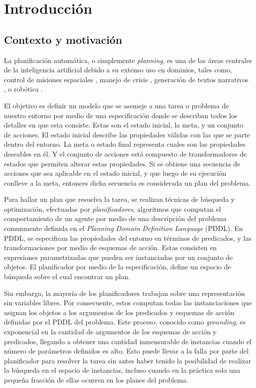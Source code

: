 \chapter{Introducción}
\label{ch:into}

\section{Contexto y motivación}
La planificación automática, o simplemente \emph{planning}, es una de las áreas
centrales de la inteligencia artificial debido a su extenso uso en dominios,
tales como, control de misiones espaciales \citep{RabideauG-et-al-2001}, manejo
de crisis \citep{Bienkowki-1995}, generación de textos narrativos
\citep{Goudoulakis-et-al-2016}, o robótica \citep{Munoz-et-al-2016}.

El objetivo es definir un modelo que se asemeje a una tarea o problema de
nuestro entorno por medio de una especificación donde se describan todos los
detalles en que esta consiste. Estas son el estado inicial, la meta, y un
conjunto de acciones. El estado inicial describe las propiedades válidas con las
que se parte dentro del entorno. La meta o estado final representa cuales son
las propiedades deseables en él. Y el conjunto de acciones está compuesto de
transformadores de estados que permiten alterar estas propiedades. Si se obtiene
una secuencia de acciones que sea aplicable en el estado inicial, y que luego de
su ejecución conlleve a la meta, entonces dicha secuencia es considerada un plan
del problema. \citep{Georgievski-et-al-2016}

Para hallar un plan que resuelva la tarea, se realizan técnicas de búsqueda y
optimización, efectuadas por \emph{planificadores}, algoritmos que computan el
comportamiento de un agente por medio de una descripción del problema comunmente
definida en el \emph{Planning Domain Definition Language} (PDDL). En PDDL, se
especifican las propiedades del entorno en términos de predicados, y las
transformaciones por medio de esquemas de acción. Estas consisten en expresiones
parametrizadas que pueden ser instanciadas por un conjunto de objetos. El
planificador por medio de la especificación, define un espacio de búsqueda sobre
el cual encontrar un plan.
\citep{Georgievski-et-al-2016}

Sin embargo, la mayoría de los planificadores trabajan sobre una representación
sin variables libres. Por consecuente, estos computan todas las instanciaciones
que asignan los objetos a los argumentos de los predicados y esquemas de acción
definidas por el PDDL del problema. Este proceso, conocido como
\emph{grounding}, es exponencial en la cantidad de argumentos de los esquemas de
acción y predicados, llegando a obtener una cantidad inmensurable de instancias
cuando el número de parámetros definidos es alto. Esto puede llevar a la falla
por parte del planificador para resolver la tarea sin antes haber tenido la
posibilidad de realizar la búsqueda en el espacio de instancias, incluso cuando
en la práctica solo una pequeña fracción de ellas ocurren en los planes del
problema.
\citep{Gnad_Torralba_Dominguez_Areces_Bustos_2019}

